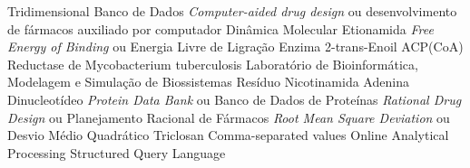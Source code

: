 \documentclass[portuguese,twoside]{pucrs-ppgcc}
\begin{document}
\begin{abstract}{lorem, ipsum, dolor, sit, amet}
Your abstract in English here. lorem ipsum dolor sit amet
consetetur sadipscing elitr sed diam nonumy eirmod tempor invidunt
ut labore et dolore magna aliquyam erat sed diam voluptua at vero
eos et accusam et justo duo dolores et ea rebum stet clita kasd
gubergren no sea takimata sanctus est lorem ipsum dolor sit amet
lorem ipsum dolor sit amet consetetur sadipscing elitr sed diam
nonumy eirmod tempor invidunt ut labore et dolore magna aliquyam
erat sed diam voluptua at
\end{abstract}

\listoffigures       %
\listoftables        %
\listofacronyms      %
\tableofcontents     %


		{Tridimensional}
		{Banco de Dados}
	{\emph{Computer-aided drug design} ou desenvolvimento de fármacos auxiliado por computador}
		{Dinâmica Molecular}
		{Etionamida}
		{\emph{Free Energy of Binding} ou Energia Livre de Ligração}
	{Enzima 2-trans-Enoil ACP(CoA) Reductase de Mycobacterium tuberculosis }
	{Laboratório de Bioinformática, Modelagem e Simulação de Biossistemas}
	{Resíduo Nicotinamida Adenina Dinucleotídeo}
		{\emph{Protein Data Bank} ou Banco de Dados de Proteínas}
		{\emph{Rational Drug Design} ou Planejamento Racional de Fármacos}
	{\emph{Root Mean Square Deviation} ou Desvio Médio Quadrático}
 	{Triclosan}
 	{Comma-separated values}
 	{Online Analytical Processing}
 	{Structured Query Language}










\end{document}
